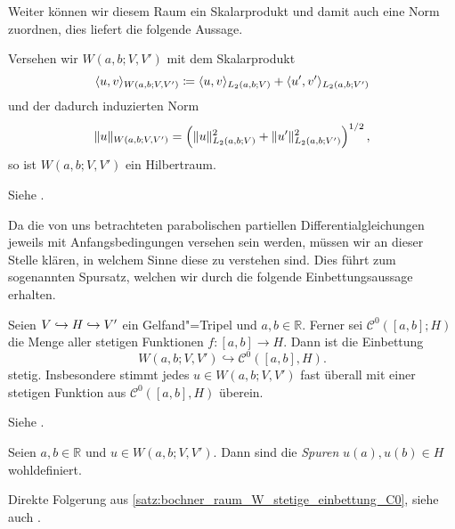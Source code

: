Weiter können wir diesem Raum ein Skalarprodukt und damit auch eine Norm zuordnen, dies liefert die folgende Aussage.

\begin{Lemma}
\label{lem:gl:br:bochner_W_ist_hilbertraum}
    Versehen wir $W(a, b; V, V')$ mit dem Skalarprodukt
    \begin{equation}
        \langle u,v\rangle_{W(a, b; V, V')} \coloneqq \langle u,v\rangle_{L_{2}(a, b; V)} + \langle u',v'\rangle_{L_{2}(a, b; V')}
    \end{equation}
    und der dadurch induzierten Norm
    \begin{equation}
        \lVert u\rVert_{W(a, b; V, V')} = \left( \lVert u\rVert_{L_{2}(a, b; V)}^{2} + \lVert u'\rVert_{L_{2}(a, b; V')}^{2} \right)^{1/2},
    \end{equation}
    so ist $W(a, b; V, V')$ ein Hilbertraum.

    \begin{Beweis}
        Siehe \cite[Proposition XVIII.2.6]{Dautray:1992by}.
    \end{Beweis}
\end{Lemma}

Da die von uns betrachteten parabolischen partiellen Differentialgleichungen jeweils mit Anfangsbedingungen versehen sein werden, müssen wir an dieser Stelle klären, in welchem Sinne diese zu verstehen sind.
Dies führt zum sogenannten Spursatz, welchen wir durch die folgende Einbettungsaussage erhalten.

\begin{Satz}
\label{satz:bochner_raum_W_stetige_einbettung_C0}
    Seien $V \hookrightarrow H \hookrightarrow V'$ ein Gelfand"=Tripel und $a, b \in \mathbb{R}$.
    Ferner sei $\mathcal C^{0}([a, b]; H)$ die Menge aller stetigen Funktionen $f \colon [a, b] \to H$.
    Dann ist die Einbettung
    \begin{equation}
        W(a, b; V, V') \hookrightarrow \mathcal C^{0}([a, b], H).
    \end{equation}
    stetig.
    Insbesondere stimmt jedes $u \in W(a, b; V, V')$ fast überall mit einer stetigen Funktion aus $\mathcal C^{0}([a, b], H)$ überein.

    \begin{Beweis}
        Siehe \cites[Theorem XVIII.2.1]{Dautray:1992by}[Theorem 10.9]{Schweizer2013}.
    \end{Beweis}
\end{Satz}

\begin{Korollar}[Spursatz]
\label{korollar:spursatz}
    Seien $a, b \in \mathbb{R}$ und $u \in W(a, b; V, V')$.
    Dann sind die \emph{Spuren} $u(a), u(b) \in H$ wohldefiniert.

    \begin{Beweis}
        Direkte Folgerung aus \cref{satz:bochner_raum_W_stetige_einbettung_C0}, siehe auch \cite[Remark XVIII.2.4]{Dautray:1992by}.
    \end{Beweis}
\end{Korollar}

